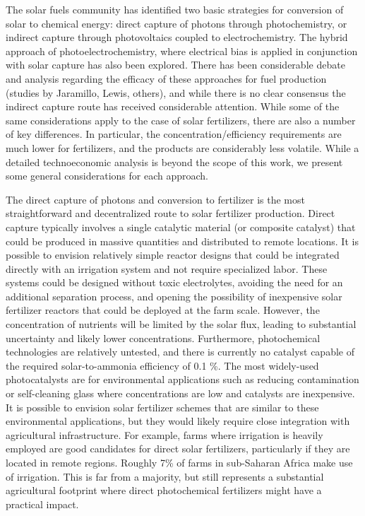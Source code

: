 The solar fuels community has identified two basic strategies for conversion of solar to chemical energy: direct capture of photons through photochemistry, or indirect capture through photovoltaics coupled to electrochemistry. The hybrid approach of photoelectrochemistry, where electrical bias is applied in conjunction with solar capture has also been explored. There has been considerable debate and analysis regarding the efficacy of these approaches for fuel production (studies by Jaramillo, Lewis, others), and while there is no clear consensus the indirect capture route has received considerable attention. While some of the same considerations apply to the case of solar fertilizers, there are also a number of key differences. In particular, the concentration/efficiency requirements are much lower for fertilizers, and the products are considerably less volatile. While a detailed technoeconomic analysis is beyond the scope of this work, we present some general considerations for each approach.

The direct capture of photons and conversion to fertilizer is the most straightforward and decentralized route to solar fertilizer production. Direct capture typically involves a single catalytic material (or composite catalyst) that could be produced in massive quantities and distributed to remote locations. It is possible to envision relatively simple reactor designs that could be integrated directly with an irrigation system and not require specialized labor. These systems could be designed without toxic electrolytes, avoiding the need for an additional separation process, and opening the possibility of inexpensive solar fertilizer reactors that could be deployed at the farm scale. However, the concentration of nutrients will be limited by the solar flux, leading to substantial uncertainty and likely lower concentrations. Furthermore, photochemical technologies are relatively untested, and there is currently no catalyst capable of the required solar-to-ammonia efficiency of 0.1 \%. The most widely-used photocatalysts are for environmental applications such as reducing contamination or self-cleaning glass where concentrations are low and catalysts are inexpensive. It is possible to envision solar fertilizer schemes that are similar to these environmental applications, but they would likely require close integration with agricultural infrastructure. For example, farms where irrigation is heavily employed are good candidates for direct solar fertilizers, particularly if they are located in remote regions. Roughly 7\% of farms in sub-Saharan Africa make use of irrigation. This is far from a majority, but still represents a substantial agricultural footprint where direct photochemical fertilizers might have a practical impact.

